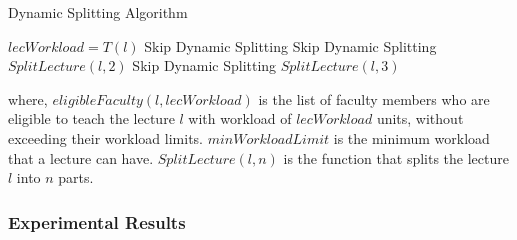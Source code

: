 \begin{algorithm}[H]
  \caption{Dynamic Splitting Algorithm}
  \begin{algorithmic}[1]
    \State $lecWorkload = T(l)$
    \State Skip Dynamic Splitting
    \State Skip Dynamic Splitting
    \State $SplitLecture(l, 2)$
    \State Skip Dynamic Splitting
    \State $SplitLecture(l, 3)$
    \EndIf
    \EndFor
    \EndProcedure
  \end{algorithmic}
  \label{alg:dynamic_splitting}
\end{algorithm}

where, $eligibleFaculty(l, lecWorkload)$ is the list of faculty members who are eligible to teach the lecture $l$ with workload of $lecWorkload$ units, without exceeding their workload limits. $minWorkloadLimit$ is the minimum workload that a lecture can have. $SplitLecture(l, n)$ is the function that splits the lecture $l$ into $n$ parts.

\subsubsection{Experimental Results}

\begin{table}[H]
  \centering

  \caption{Dynamic Splitting Results}
  \label{tab:dynamic_splitting_results}
\end{table}

